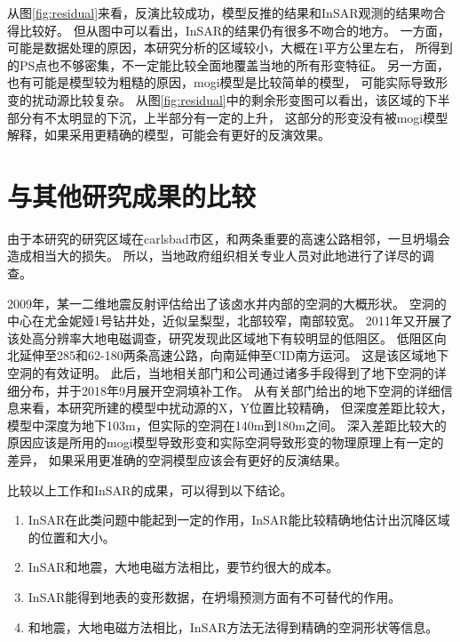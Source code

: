 从图\ref{fig:residual}来看，反演比较成功，模型反推的结果和InSAR观测的结果吻合得比较好。
但从图中可以看出，InSAR的结果仍有很多不吻合的地方。
一方面，可能是数据处理的原因，本研究分析的区域较小，大概在1平方公里左右，
所得到的PS点也不够密集，不一定能比较全面地覆盖当地的所有形变特征。
另一方面，也有可能是模型较为粗糙的原因，mogi模型是比较简单的模型，
可能实际导致形变的扰动源比较复杂。
从图\ref{fig:residual}中的剩余形变图可以看出，该区域的下半部分有不太明显的下沉，上半部分有一定的上升，
这部分的形变没有被mogi模型解释，如果采用更精确的模型，可能会有更好的反演效果。

\section{与其他研究成果的比较}
由于本研究的研究区域在carlsbad市区，和两条重要的高速公路相邻，一旦坍塌会造成相当大的损失。
所以，当地政府组织相关专业人员对此地进行了详尽的调查。

2009年，某一二维地震反射评估给出了该卤水井内部的空洞的大概形状。
空洞的中心在尤金妮娅1号钻井处，近似呈梨型，北部较窄，南部较宽。
2011年又开展了该处高分辨率大地电磁调查，研究发现此区域地下有较明显的低阻区。
低阻区向北延伸至285和62-180两条高速公路，向南延伸至CID南方运河。
这是该区域地下空洞的有效证明。
此后，当地相关部门和公司通过诸多手段得到了地下空洞的详细分布，并于2018年9月展开空洞填补工作。
从有关部门给出的地下空洞的详细信息来看，本研究所建的模型中扰动源的X，Y位置比较精确，
但深度差距比较大，模型中深度为地下103m，但实际的空洞在140m到180m之间。
深入差距比较大的原因应该是所用的mogi模型导致形变和实际空洞导致形变的物理原理上有一定的差异，
如果采用更准确的空洞模型应该会有更好的反演结果。

比较以上工作和InSAR的成果，可以得到以下结论。
\begin{enumerate}
    \item InSAR在此类问题中能起到一定的作用，InSAR能比较精确地估计出沉降区域的位置和大小。
    \item InSAR和地震，大地电磁方法相比，要节约很大的成本。
    \item InSAR能得到地表的变形数据，在坍塌预测方面有不可替代的作用。
    \item 和地震，大地电磁方法相比，InSAR方法无法得到精确的空洞形状等信息。
\end{enumerate}